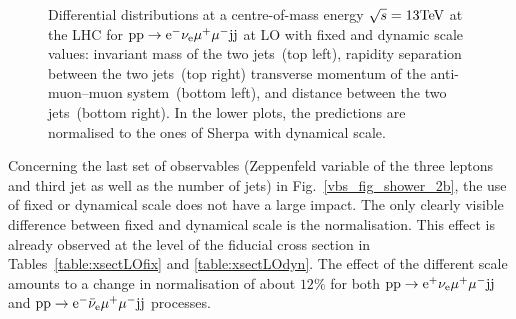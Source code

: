 \documentclass[11pt]{cernrep}
\begin{document}
\begin{figure}[htbp]
\begin{center}
\caption{Differential distributions at a centre-of-mass energy $\sqrt{s}=13{\rm TeV}$ at the LHC for ${\rm p} {\rm p}
  \to {\rm e}^-  \nu_{\rm e}  \mu^+ \mu^- {\rm j} {\rm j}$ at LO with fixed and dynamic scale values:  
                invariant mass of the two jets~(top left),
                rapidity separation between the two jets~(top right)
                transverse momentum of the anti-muon--muon system~(bottom left), and
                distance between the two jets~(bottom right).
                In the lower plots, the predictions are normalised to the ones of {\sc Sherpa} with dynamical scale.}
\label{vbs_fig_shower_2a}
\end{center}
\end{figure}

Concerning the last set of observables (Zeppenfeld variable of the three leptons and third jet as well as the number of jets) in Fig.~\ref{vbs_fig_shower_2b}, the use of fixed or dynamical scale does not have a large impact.
The only clearly visible difference between fixed and dynamical scale is the normalisation.
This effect is already observed at the level of the fiducial cross section in Tables~\ref{table:xsectLOfix} and \ref{table:xsectLOdyn}.
The effect of the different scale amounts to a change in normalisation of about $12\%$ for both ${\rm p}{\rm p}\to{\rm e}^+\nu_{\rm e}\mu^+\mu^-{\rm j}{\rm j}$ and ${\rm p}{\rm p}\to{\rm e}^-\bar\nu_{\rm e}\mu^+\mu^-{\rm j}{\rm j}$ processes.
\end{document}
